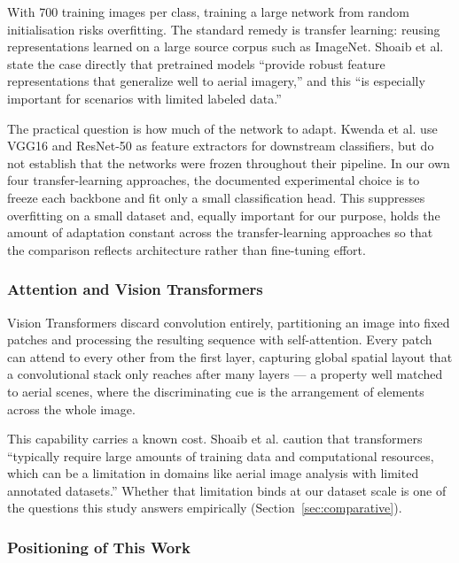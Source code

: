 \documentclass[11pt,twoside,a4paper]{article}
\begin{document}
With 700 training images per class, training a large network from random
initialisation risks overfitting. The standard remedy is transfer learning:
reusing representations learned on a large source corpus such as ImageNet.
Shoaib et al. \cite{Shoaib2025} state the case directly that pretrained models
``provide robust feature representations that generalize well to aerial
imagery,'' and this ``is especially important for scenarios with limited
labeled data.''

The practical question is how much of the network to adapt. Kwenda et al.
\cite{Kwenda2024} use VGG16 and ResNet-50 as feature extractors for downstream
classifiers, but do not establish that the networks were frozen throughout
their pipeline. In our own four transfer-learning approaches, the documented
experimental choice is to freeze each backbone and fit only a small
classification head. This
suppresses overfitting on a small dataset and, equally important for our
purpose, holds the amount of adaptation constant across the transfer-learning
approaches so that the comparison reflects architecture rather than fine-tuning
effort.

\subsubsection{Attention and Vision Transformers}

Vision Transformers \cite{Dosovitskiy2021} discard convolution entirely,
partitioning an image into fixed patches and processing the resulting sequence
with self-attention. Every patch can attend to every other from the first
layer, capturing global spatial layout that a convolutional stack only reaches
after many layers --- a property well matched to aerial scenes, where the
discriminating cue is the arrangement of elements across the whole image.

This capability carries a known cost. Shoaib et al. \cite{Shoaib2025} caution
that transformers ``typically require large amounts of training data and
computational resources, which can be a limitation in domains like aerial image
analysis with limited annotated datasets.'' Whether that limitation binds at our
dataset scale is one of the questions this study answers empirically
(Section~\ref{sec:comparative}).

\subsubsection{Positioning of This Work}
\end{document}
